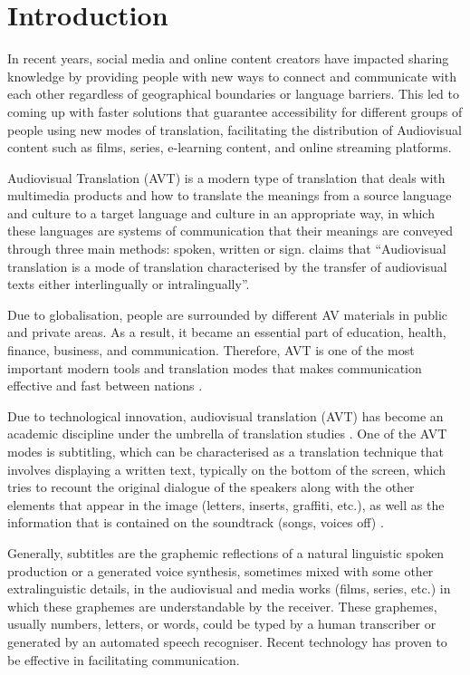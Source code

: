 \documentclass[english]{textolivre}
\begin{document}
\section{Introduction}\label{sec-intro}

In recent years, social media and online content creators have impacted
sharing knowledge by providing people with new ways to connect and
communicate with each other regardless of geographical boundaries or
language barriers. This led to coming up with faster solutions that
guarantee accessibility for different groups of people using new modes
of translation, facilitating the distribution of Audiovisual content
such as films, series, e-learning content, and online streaming
platforms.

Audiovisual Translation (AVT) is a modern type of translation that deals
with multimedia products and how to translate the meanings from a source
language and culture to a target language and culture in an appropriate
way, in which these languages are systems of communication that their
meanings are conveyed through three main methods: spoken, written or
sign. \textcite[p. 105]{chaume_turn_2013} claims that ``Audiovisual
translation is a mode of translation characterised by the transfer of
audiovisual texts either interlingually or intralingually''.

Due to globalisation, people are surrounded by different AV materials in
public and private areas. As a result, it became an essential part of
education, health, finance, business, and communication. Therefore, AVT
is one of the most important modern tools and translation modes that
makes communication effective and fast between nations \cite{al-abbas_using_2021,haider_dubbing_2022, haider_subtitling_2023, jarrah_strategies_2023}.

Due to technological innovation, audiovisual translation (AVT) has
become an academic discipline under the umbrella of translation studies
\cite{remael_audiovisual_2010}. One of the AVT modes is subtitling, which can be
characterised as a translation technique that involves displaying a
written text, typically on the bottom of the screen, which tries to
recount the original dialogue of the speakers along with the other
elements that appear in the image (letters, inserts, graffiti, etc.), as
well as the information that is contained on the soundtrack (songs,
voices off) \cite{diaz-cintas__2007}.

Generally, subtitles are the graphemic reflections of a natural
linguistic spoken production or a generated voice synthesis, sometimes
mixed with some other extralinguistic details, in the audiovisual and
media works (films, series, etc.) in which these graphemes are
understandable by the receiver. These graphemes, usually numbers,
letters, or words, could be typed by a human transcriber or generated by
an automated speech recogniser. Recent technology has proven to be
effective in facilitating communication.
\end{document}
